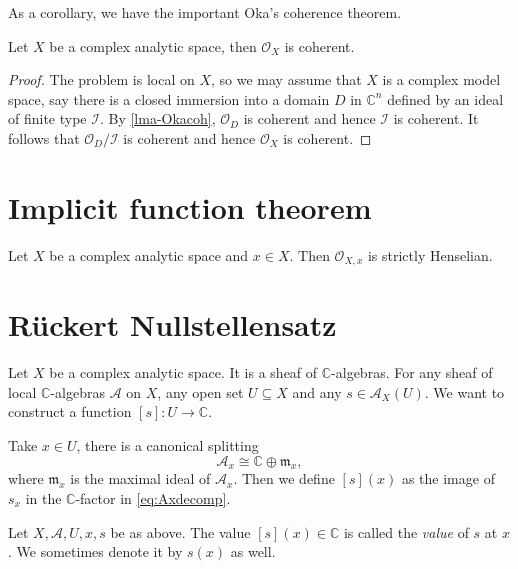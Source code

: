 As a corollary, we have the important Oka's coherence theorem.
\begin{theorem}\label{thm-Okacoh}
    Let $X$ be a complex analytic space, then $\mathcal{O}_X$ is coherent.
\end{theorem}
\begin{proof}
    The problem is local on $X$, so we may assume that $X$ is a complex model space, say there is a closed immersion into a domain $D$ in $\mathbb{C}^n$ defined by an ideal of finite type $\mathcal{I}$. By \cref{lma-Okacoh}, $\mathcal{O}_D$ is coherent and hence $\mathcal{I}$ is coherent. It follows that $\mathcal{O}_D/\mathcal{I}$ is coherent and hence $\mathcal{O}_X$ is coherent.
\end{proof}


\section{Implicit function theorem}

\begin{theorem}
    Let $X$ be a complex analytic space and $x\in X$. Then $\mathcal{O}_{X,x}$ is strictly Henselian.
\end{theorem}

\section{Rückert Nullstellensatz}

Let $X$ be a complex analytic space. It is a sheaf of $\mathbb{C}$-algebras.
For any sheaf of local $\mathbb{C}$-algebras $\mathcal{A}$ on $X$, any open set $U\subseteq X$ and any $s\in \mathcal{A}_X(U)$. We want to construct a function $[s]:U\rightarrow \mathbb{C}$.

Take $x\in U$, there is a canonical splitting
\begin{equation}\label{eq:Axdecomp}
  \mathcal{A}_{x}\cong \mathbb{C}\oplus \mathfrak{m}_{x}, 
\end{equation}
where $\mathfrak{m}_x$ is the maximal ideal of $\mathcal{A}_{x}$. Then we define $[s](x)$ as the image of $s_x$ in the $\mathbb{C}$-factor in \eqref{eq:Axdecomp}.

\begin{definition}\label{def-valuesectionatapoint}
    Let $X,\mathcal{A},U,x,s$ be as above. The value $[s](x)\in \mathbb{C}$ is called the \emph{value} of $s$ at $x$. We sometimes denote it by $s(x)$ as well.
\end{definition}

